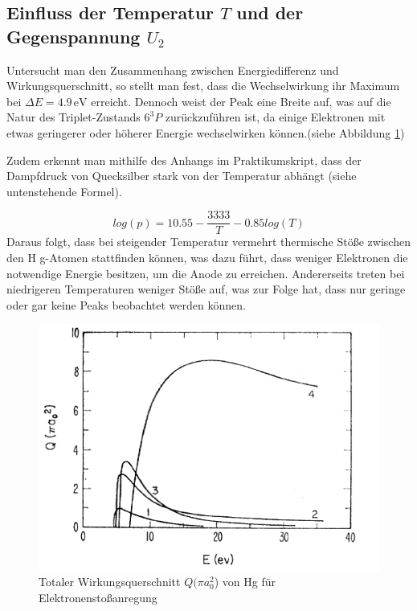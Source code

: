 \documentclass{article}
\begin{document}
\begin{multicols}{2}
\subsection{Einfluss der Temperatur $T$ und der Gegenspannung $U_2$}

Untersucht man den Zusammenhang zwischen Energiedifferenz und Wirkungsquerschnitt, so 
stellt man fest, dass die Wechselwirkung ihr Maximum bei $\Delta E = 4{.}9 \, \mathrm{eV}$ 
erreicht. Dennoch weist der Peak eine Breite auf, was auf die Natur des Triplet-Zustands 
$6^3P$ zurückzuführen ist, da einige Elektronen mit etwas geringerer oder höherer Energie 
wechselwirken können.(siehe Abbildung \ref{Wirkungsquerschnitt})

Zudem erkennt man mithilfe des Anhangs im Praktikumskript, dass der Dampfdruck von 
Quecksilber stark von der Temperatur abhängt (siehe untenstehende Formel).

\begin{equation*}
  log(p) = 10.55 - \frac{3333}{T} - 0.85log(T)
\end{equation*}
Daraus folgt, dass bei steigender Temperatur vermehrt thermische Stöße zwischen den H
g-Atomen stattfinden können, was dazu führt, dass weniger Elektronen die notwendige 
Energie besitzen, um die Anode zu erreichen. Andererseits treten bei niedrigeren 
Temperaturen weniger Stöße auf, was zur Folge hat, dass nur geringe oder gar keine Peaks 
beobachtet werden können.


\begin{figure}[H]
  \centering
  \includegraphics[scale=0.55]{Totaler Wirkungsquerschnitt.png}
  \caption{Totaler Wirkungsquerschnitt $Q(\pi a^2_0$) von Hg für Elektronenstoßanregung}
  \label{Wirkungsquerschnitt}
\end{figure}
\clearpage

\end{multicols}
\end{document}
